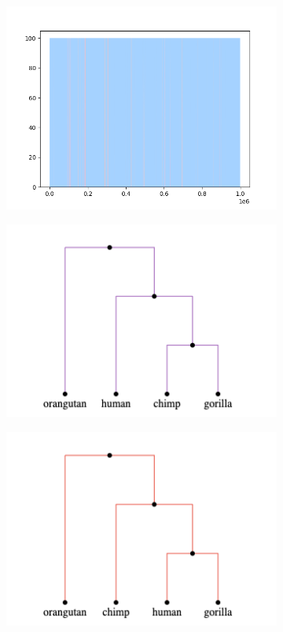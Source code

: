 \documentclass{article}
\begin{document}
\begin{figure}[H]
    \begin{minipage}{.48\textwidth}
        \begin{subfigure}{\linewidth}
            \includegraphics[scale=0.48]{great_apes_area_plot.png}
        \end{subfigure}
    \end{minipage}
    \begin{minipage}{.48\textwidth}
        \begin{minipage}{.4\textwidth}
            \begin{subfigure}[b]{\linewidth}
                \includegraphics[scale=0.3]{tree_0.png}
            \end{subfigure}
            \begin{subfigure}[b]{\linewidth}
                \includegraphics[scale=0.3]{tree_1.png}

\end{subfigure}
\end{minipage}
\end{minipage}
\end{figure}
\end{document}
